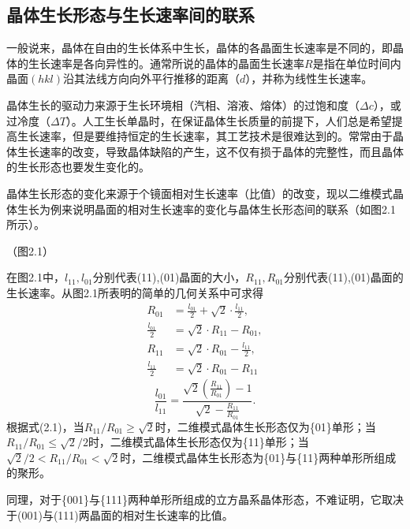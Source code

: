 \subsection{晶体生长形态与生长速率间的联系}
一般说来，晶体在自由的生长体系中生长，晶体的各晶面生长速率是不同的，即晶体的生长速率是各向异性的。通常所说的晶体的晶面生长速率$R$是指在单位时间内晶面$(hkl)$沿其法线方向向外平行推移的距离（$d$），并称为线性生长速率。

晶体生长的驱动力来源于生长环境相（汽相、溶液、熔体）的过饱和度（$\Delta c$），或过冷度（$\Delta T$）。人工生长单晶时，在保证晶体生长质量的前提下，人们总是希望提高生长速率，但是要维持恒定的生长速率，其工艺技术是很难达到的。常常由于晶体生长速率的改变，导致晶体缺陷的产生，这不仅有损于晶体的完整性，而且晶体的生长形态也要发生变化的。

晶体生长形态的变化来源于个镜面相对生长速率（比值）的改变，现以二维模式晶体生长为例来说明晶面的相对生长速率的变化与晶体生长形态间的联系（如图2.1所示）。

（图2.1）

在图2.1中，$l_{11},l_{01}$分别代表(11),(01)晶面的大小，$R_{11},R_{01}$分别代表(11),(01)晶面的生长速率。从图2.1所表明的简单的几何关系中可求得
\begin{align*}
R_{01}&=\frac{l_{01}}{2}+\sqrt{2}\cdot\frac{l_{11}}{2},\\
\frac{l_{01}}{2}&=\sqrt{2}\cdot R_{11}-R_{01},\\
R_{11}&=\sqrt{2}\cdot R_{01}-\frac{l_{11}}{2},\\
\frac{l_{11}}{2}&=\sqrt{2}\cdot R_{01}-R_{11}
\end{align*}
\begin{equation}
\frac{l_{01}}{l_{11}}=\frac{\displaystyle\sqrt{2}\left(\frac{R_{11}}{R_{01}}\right)-1}{\displaystyle\sqrt{2}-\frac{R_{11}}{R_{01}}}.
\end{equation}
根据式(2.1)，当$R_{11}/R_{01}\geq\sqrt{2}$时，二维模式晶体生长形态仅为\{01\}单形；当$R_{11}/R_{01}\leq\sqrt{2}/2$时，二维模式晶体生长形态仅为\{11\}单形；当$\sqrt{2}/2<R_{11}/R_{01}<\sqrt{2}$时，二维模式晶体生长形态为\{01\}与\{11\}两种单形所组成的聚形。

同理，对于\{001\}与\{111\}两种单形所组成的立方晶系晶体形态，不难证明，它取决于(001)与(111)两晶面的相对生长速率的比值。
